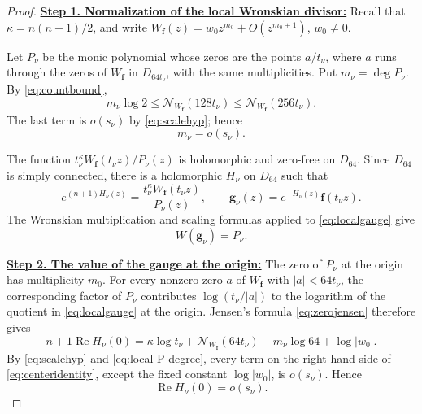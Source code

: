 \documentclass[12pt,letterpaper,reqno]{amsart}
\theoremstyle{definition}
\numberwithin{equation}{section}
\newcommand{\NN}{\mathcal N}
\DeclareMathOperator{\Ree}{Re}
\newcommand{\fv}{\bm f}
\newcommand{\gv}{\bm g}
\begin{document}
\begin{proof}

\medskip\noindent
\textbf{\underline{Step 1. Normalization of the local Wronskian divisor:}}
Recall that
\(\kappa=n(n+1)/2\), and write
\(W_{\fv}(z)=w_0z^{m_0}+O(z^{m_0+1})\), \(w_0\ne0\).

Let \(P_\nu\) be the monic polynomial whose zeros are the points
\(a/t_\nu\), where \(a\) runs through the zeros of \(W_{\fv}\) in
\(D_{64t_\nu}\), with the same multiplicities. Put
\(m_\nu=\deg P_\nu\). By \eqref{eq:countbound},
\[
 m_\nu\log2
 \leq
 \NN_{W_{\fv}}(128t_\nu)
 \leq
 \NN_{W_{\fv}}(256t_\nu).
\]
The last term is \(o(s_\nu)\) by \eqref{eq:scalehyp}; hence
\begin{equation}\label{eq:local-P-degree}
 m_\nu=o(s_\nu).
\end{equation}

The function
\(t_\nu^\kappa W_{\fv}(t_\nu z)/P_\nu(z)\)
is holomorphic and zero-free on \(D_{64}\). Since \(D_{64}\) is simply
connected, there is a holomorphic \(H_\nu\) on \(D_{64}\) such that
\begin{equation}\label{eq:localgauge}
 e^{(n+1)H_\nu(z)}
 =
 \frac{t_\nu^\kappa W_{\fv}(t_\nu z)}{P_\nu(z)},
 \qquad
 \gv_\nu(z)
 =
 e^{-H_\nu(z)}\fv(t_\nu z).
\end{equation}
The Wronskian multiplication and scaling formulas applied to
\eqref{eq:localgauge} give
\begin{equation}\label{eq:local-wronskian-normalization}
 W(\gv_\nu)=P_\nu.
\end{equation}


\medskip\noindent
\textbf{\underline{Step 2. The value of the gauge at the origin:}}
The zero of \(P_\nu\) at the origin has multiplicity \(m_0\). For every
nonzero zero \(a\) of \(W_{\fv}\) with \(|a|<64t_\nu\), the
corresponding factor of \(P_\nu\) contributes
\(\log(t_\nu/|a|)\) to the logarithm of the quotient in
\eqref{eq:localgauge} at the origin. Jensen's formula
\eqref{eq:zerojensen} therefore gives
\begin{equation}\label{eq:centeridentity}
 {n+1}\Ree H_\nu(0)
 =
 \kappa\log t_\nu
 +
 \NN_{W_{\fv}}(64t_\nu)
 -
 m_\nu\log64
 +
 \log|w_0|.
\end{equation}
By \eqref{eq:scalehyp} and \eqref{eq:local-P-degree}, every term on
the right-hand side of \eqref{eq:centeridentity}, except the fixed
constant \(\log|w_0|\), is \(o(s_\nu)\). Hence
\begin{equation}\label{eq:H-center-small}
 \Ree H_\nu(0)=o(s_\nu).
\end{equation}


\end{proof}
\end{document}
